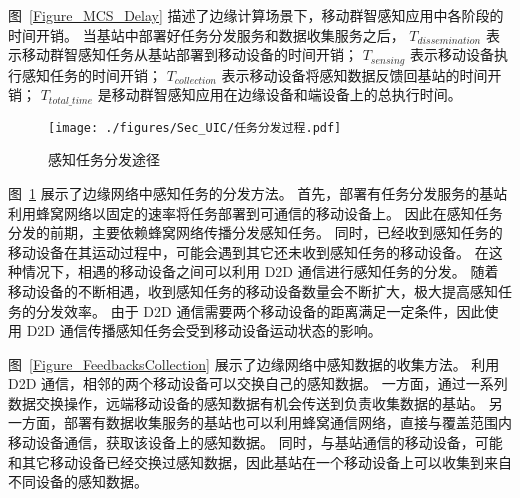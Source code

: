 图~\ref{Figure_MCS_Delay} 描述了边缘计算场景下，移动群智感知应用中各阶段的时间开销。
当基站中部署好任务分发服务和数据收集服务之后，
$T_{dissemination}$ 表示移动群智感知任务从基站部署到移动设备的时间开销；
$T_{sensing}$ 表示移动设备执行感知任务的时间开销；
$T_{collection}$ 表示移动设备将感知数据反馈回基站的时间开销；
$T_{total\_time}$ 是移动群智感知应用在边缘设备和端设备上的总执行时间。


\begin{figure}[!b]
  \centering
  \texttt{[image: ./figures/Sec\_UIC/任务分发过程.pdf]}
  \vspace{-0.5em}
  \caption{感知任务分发途径}
  \label{Figure_PropagationProcedure}
\end{figure}

图~\ref{Figure_PropagationProcedure} 展示了边缘网络中感知任务的分发方法。
首先，部署有任务分发服务的基站利用蜂窝网络以固定的速率将任务部署到可通信的移动设备上。
因此在感知任务分发的前期，主要依赖蜂窝网络传播分发感知任务。
同时，已经收到感知任务的移动设备在其运动过程中，可能会遇到其它还未收到感知任务的移动设备。
在这种情况下，相遇的移动设备之间可以利用 D2D 通信进行感知任务的分发。
随着移动设备的不断相遇，收到感知任务的移动设备数量会不断扩大，极大提高感知任务的分发效率。
由于 D2D 通信需要两个移动设备的距离满足一定条件，因此使用 D2D 通信传播感知任务会受到移动设备运动状态的影响。

图~\ref{Figure_FeedbacksCollection} 展示了边缘网络中感知数据的收集方法。
利用 D2D 通信，相邻的两个移动设备可以交换自己的感知数据。
一方面，通过一系列数据交换操作，远端移动设备的感知数据有机会传送到负责收集数据的基站。
另一方面，部署有数据收集服务的基站也可以利用蜂窝通信网络，直接与覆盖范围内移动设备通信，获取该设备上的感知数据。
同时，与基站通信的移动设备，可能和其它移动设备已经交换过感知数据，因此基站在一个移动设备上可以收集到来自不同设备的感知数据。


